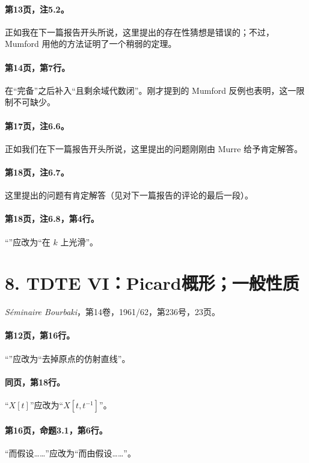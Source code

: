 \paragraph{第13页，注5.2。}正如我在下一篇报告开头所说，这里提出的存在性猜想是错误的；不过，Mumford 用他的方法证明了一个稍弱的定理。

\paragraph{第14页，第7行。}在“完备”之后补入“且剩余域代数闭”。刚才提到的 Mumford 反例也表明，这一限制不可缺少。

\paragraph{第17页，注6.6。}正如我们在下一篇报告开头所说，这里提出的问题刚刚由 Murre 给予肯定解答。

\paragraph{第18页，注6.7。}这里提出的问题有肯定解答（见对下一篇报告的评论的最后一段）。

\paragraph{第18页，注6.8，第4行。}“”应改为“在 $k$ 上光滑”。

\section*{8. TDTE VI：Picard概形；一般性质}
\noindent\textit{Séminaire Bourbaki}，第14卷，1961/62，第236号，23页。

\paragraph{第12页，第16行。}“”应改为“去掉原点的仿射直线”。

\paragraph{同页，第18行。}“$X[t]$”应改为“$X[t,t^{-1}]$”。

\paragraph{第16页，命题3.1，第6行。}“而假设……”应改为“而由假设……”。

